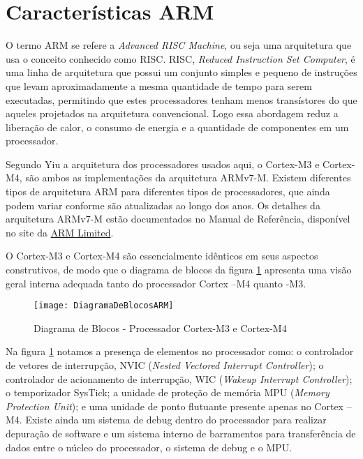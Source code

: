 \section{Características ARM}

O termo ARM se refere a \emph{Advanced RISC Machine}, ou seja uma arquitetura que usa o conceito conhecido como RISC. RISC, \emph{Reduced Instruction Set Computer}, é uma linha de arquitetura que possui um conjunto simples e pequeno de instruções que levam aproximadamente a mesma quantidade de tempo para serem executadas, permitindo que estes processadores tenham menos transístores do que aqueles projetados na arquitetura convencional. Logo essa abordagem reduz a liberação de calor, o consumo de energia e a quantidade de componentes em um processador.

Segundo  Yiu \cite{ARMGUIDE} a arquitetura dos processadores usados aqui, o Cortex-M3 e Cortex-M4, são ambos as implementações da arquitetura ARMv7-M. Existem diferentes tipos de arquitetura ARM para diferentes tipos de processadores, que ainda podem variar conforme são atualizadas ao longo dos anos. Os detalhes da arquitetura ARMv7-M estão documentados no Manual de Referência, disponível no site da  \href{http://infocenter.arm.com/help/index.jsp}{ARM Limited}.

O Cortex-M3 e Cortex-M4 são essencialmente idênticos em seus aspectos construtivos, de modo que o diagrama de blocos da figura \ref{DiagramaDeBlocosARM}  apresenta uma visão  geral interna adequada tanto do processador Cortex –M4 quanto -M3.

\begin{figure}[h]
	\centering
	\texttt{[image: DiagramaDeBlocosARM]}
	\caption{Diagrama de Blocos - Processador Cortex-M3 e Cortex-M4 \cite{DATASHEET_TIVA}}
	\label{DiagramaDeBlocosARM}
\end{figure}

Na figura \ref{DiagramaDeBlocosARM} notamos a presença de elementos no processador como:  o controlador de vetores de interrupção, NVIC (\emph{Nested Vectored Interrupt Controller}); o controlador de acionamento de interrupção, WIC (\emph{Wakeup Interrupt Controller}); o temporizador SysTick; a unidade de proteção de memória MPU (\emph{Memory Protection Unit}); e uma unidade de ponto flutuante presente apenas no Cortex –M4. Existe ainda um sistema de debug dentro do processador para realizar depuração de software e um sistema interno de barramentos para transferência de dados entre o núcleo do processador, o sistema de debug e o MPU. 

